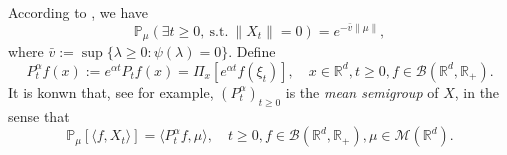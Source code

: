 \documentclass[12pt,a4paper]{amsart}
\theoremstyle{plain}
\theoremstyle{definition}
\numberwithin{equation}{section}
\begin{document}
    According to \cite[Theorem 12.5 \& Theorem 12.7]{Kyprianou2014Fluctuations}, we have
\begin{equation}
    \mathbb{P}_{\mu} (\exists t\geq 0,~\text{s.t.}~\|X_t\|=0)
    = e^{-\bar v \|\mu\|},
\end{equation}
    where $\bar v := \sup\{\lambda \geq 0: \psi(\lambda) = 0\}$.
    Define
\begin{equation}\label{meansemigroup}
    P^{\alpha}_t f(x)
    :=
    e^{\alpha t} P_t f(x) =
    \Pi_x [e^{\alpha t}f(\xi_t)],
    \quad x\in \mathbb R^d,t\geq 0, f\in \mathcal B(\mathbb R^d, \mathbb R_+).
\end{equation}
    It is konwn that, see \cite[Proposition 2.27]{Li2011Measure-valued} for example, $(P^\alpha_t)_{t\geq 0}$ is the \emph{mean semigroup} of $X$, in the sense that
\begin{equation}\label{eq:meanformula}
    \mathbb{P}_{\mu}[\langle f, X_t \rangle]
    = \langle P^\alpha_t f, \mu \rangle,
    \quad t\geq 0, f\in \mathcal B(\mathbb R^d, \mathbb R_+), \mu \in \mathcal M(\mathbb R^d).
\end{equation}
\end{document}
